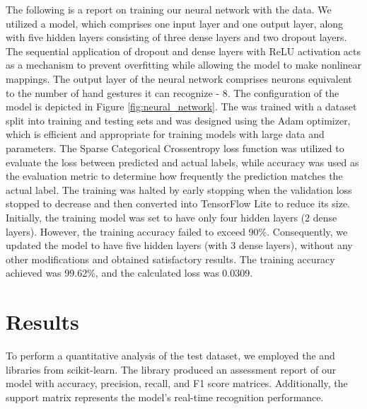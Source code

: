 The following is a report on training our neural network with the data. We utilized a model, which comprises one input layer and one output layer, along with five hidden layers consisting of three dense layers and two dropout layers. The sequential application of dropout and dense layers with ReLU activation acts as a mechanism to prevent overfitting while allowing the model to make nonlinear mappings. The output layer of the neural network comprises neurons equivalent to the number of hand gestures it can recognize - 8. The configuration of the model is depicted in Figure \ref{fig:neural_network}. The was trained with a dataset split into training and testing sets and was designed using the Adam optimizer, which is efficient and appropriate for training models with large data and parameters. The Sparse Categorical Crossentropy loss function was utilized to evaluate the loss between predicted and actual labels, while accuracy was used as the evaluation metric to determine how frequently the prediction matches the actual label. The training was halted by early stopping when the validation loss stopped to decrease and then converted into TensorFlow Lite to reduce its size. Initially, the training model was set to have only four hidden layers (2 dense layers). However, the training accuracy failed to exceed 90\%. Consequently, we updated the model to have five hidden layers (with 3 dense layers), without any other modifications and obtained satisfactory results. The training accuracy achieved was 99.62\%, and the calculated loss was 0.0309.





\section{Results}

To perform a quantitative analysis of the test dataset, we employed the   and   libraries from scikit-learn. The  library produced an assessment report of our model with accuracy, precision, recall, and F1 score matrices. Additionally, the support matrix represents the model's real-time recognition performance.


